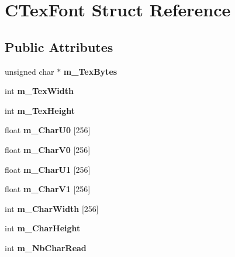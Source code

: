 \hypertarget{struct_c_tex_font}{\section{C\+Tex\+Font Struct Reference}
\label{struct_c_tex_font}
}
\subsection*{Public Attributes}
\begin{DoxyCompactItemize}
\item 
\hypertarget{struct_c_tex_font_a86ccb64ef09e3d5c5bd6134cdc8b5ba7}{unsigned char $\ast$ {\bfseries m\+\_\+\+Tex\+Bytes}}\label{struct_c_tex_font_a86ccb64ef09e3d5c5bd6134cdc8b5ba7}

\item 
\hypertarget{struct_c_tex_font_aabee3d0efaee0aba5f92def586c3045e}{int {\bfseries m\+\_\+\+Tex\+Width}}\label{struct_c_tex_font_aabee3d0efaee0aba5f92def586c3045e}

\item 
\hypertarget{struct_c_tex_font_ab627ebc306573545f6bc592076306e3a}{int {\bfseries m\+\_\+\+Tex\+Height}}\label{struct_c_tex_font_ab627ebc306573545f6bc592076306e3a}

\item 
\hypertarget{struct_c_tex_font_a52512eeec03880e3a352000c8018f2b1}{float {\bfseries m\+\_\+\+Char\+U0} \mbox{[}256\mbox{]}}\label{struct_c_tex_font_a52512eeec03880e3a352000c8018f2b1}

\item 
\hypertarget{struct_c_tex_font_a31dcd87c7388243eeaf126253cd83ef7}{float {\bfseries m\+\_\+\+Char\+V0} \mbox{[}256\mbox{]}}\label{struct_c_tex_font_a31dcd87c7388243eeaf126253cd83ef7}

\item 
\hypertarget{struct_c_tex_font_afbe7366bb018f683cec98b967a425670}{float {\bfseries m\+\_\+\+Char\+U1} \mbox{[}256\mbox{]}}\label{struct_c_tex_font_afbe7366bb018f683cec98b967a425670}

\item 
\hypertarget{struct_c_tex_font_a31f2c5e7470ee888007db5e44c0c1de2}{float {\bfseries m\+\_\+\+Char\+V1} \mbox{[}256\mbox{]}}\label{struct_c_tex_font_a31f2c5e7470ee888007db5e44c0c1de2}

\item 
\hypertarget{struct_c_tex_font_a8a4c358320a584db4abfa807ff8c5313}{int {\bfseries m\+\_\+\+Char\+Width} \mbox{[}256\mbox{]}}\label{struct_c_tex_font_a8a4c358320a584db4abfa807ff8c5313}

\item 
\hypertarget{struct_c_tex_font_ae36c70b9154b5b8f6ebbf1b26f7974d1}{int {\bfseries m\+\_\+\+Char\+Height}}\label{struct_c_tex_font_ae36c70b9154b5b8f6ebbf1b26f7974d1}

\item 
\hypertarget{struct_c_tex_font_a13c4f9f6e64214621093ba6949a47cd4}{int {\bfseries m\+\_\+\+Nb\+Char\+Read}}\label{struct_c_tex_font_a13c4f9f6e64214621093ba6949a47cd4}

\end{DoxyCompactItemize}


